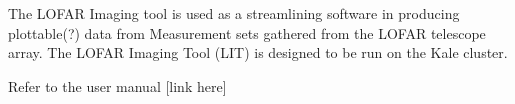 The L\+O\+F\+AR Imaging tool is used as a streamlining software in producing plottable(?) data from Measurement sets gathered from the L\+O\+F\+AR telescope array. The L\+O\+F\+AR Imaging Tool (L\+IT) is designed to be run on the Kale cluster.

Refer to the user manual \mbox{[}link here\mbox{]} 